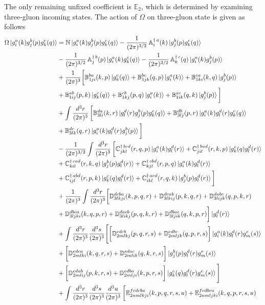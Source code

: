 \documentclass[a4paper,11pt]{article}
\def\mf#1{\mathbb{#1}}
\begin{document}
The only remaining unfixed coefficient is  $\mf{E}_{2}$, which is determined by examining three-gluon incoming states. The action of $\Omega$ on three-gluon state is given as follows
\begin{align}\label{eq:Omegaonggg}
    \Omega\ket{g^{a}_{i}(k)g^{b}_{j}(p)g^{c}_{k}(q)} & = \mf{N}\ket{g^{a}_{i}(k)g^{b}_{j}(p)g^{c}_{k}(q)}  -\frac{1}{(2\pi)^{3/2}}\, \mf{A}^{\dagger\, a}_{i}(k) \ket{g^{b}_{j}(p)g^{c}_{k}(q)} \notag \\ & - \frac{1}{(2\pi)^{3/2}}\, \mf{A}^{\dagger\, b}_{j}(p) \ket{g^{a}_{i}(k)g^{c}_{k}(q)} - \frac{1}{(2\pi)^{3/2}}\, \mf{A}^{\dagger\, c}_{k}(q) \ket{g^{a}_{i}(k)g^{b}_{j}(p)}\notag \\ & +  \frac{1}{(2\pi)^{3}}\bigg[\mf{B}^{ba}_{1ji}(k,p) \ket{g^{c}_{k}(q)} + \mf{B}^{bc}_{1jk}(q,p) \ket{g^{a}_{i}(k)}+\mf{B}^{ca}_{1ki}(k,q) \ket{g^{b}_{j}(p)}\notag \\ & +\mf{B}^{ab}_{1ij}(p,k) \ket{g^{c}_{k}(q)} + \mf{B}^{cb}_{1kj}(p,q) \ket{g^{a}_{i}(k)}+\mf{B}^{ac}_{1ik}(q,k) \ket{g^{b}_{j}(p)}  \bigg]\notag \\ & + \int \frac{d^{3}r}{(2\pi)^{3}}\, \bigg[\mf{B}^{da}_{3li}(k,r)\ket{g^{d}_{l}(r)g^{b}_{j}(p)g^{c}_{k}(q)}+\mf{B}^{db}_{3lj}(p,r)\ket{g^{a}_{i}(k)g^{d}_{l}(r)g^{c}_{k}(q)}\notag \\ & +\mf{B}^{dc}_{3lk}(q,r)\ket{g^{a}_{i}(k)g^{d}_{l}(r)g^{b}_{j}(p)}\bigg] \notag \\ & - \frac{1}{(2\pi)^{3/2}}\int \frac{d^{3}r}{(2\pi)^{3}}\,\bigg[\mf{C}^{\dagger\,bcd}_{jkl}(r,q,p)\ket{g^{a}_{i}(k)g^{d}_{l}(r)}+\mf{C}^{\dagger\,bad}_{jil}(r,k,p)\ket{g^{c}_{k}(q)g^{d}_{l}(r)}\notag \\ & +\mf{C}^{\dagger\,cad}_{kil}(r,k,q)\ket{g^{b}_{j}(p)g^{d}_{l}(r)}+\mf{C}^{\dagger\,cbd}_{kjl}(r,p,q)\ket{g^{a}_{i}(k)g^{d}_{l}(r)}\notag \\ & +\mf{C}^{\dagger\,abd}_{ijl}(r,p,k)\ket{g^{c}_{k}(q)g^{d}_{l}(r)}+\mf{C}^{\dagger\,acd}_{ikl}(r,q,k)\ket{g^{b}_{j}(p)g^{d}_{l}(r)}\bigg]\notag \\ & +  \frac{1}{(2\pi)^{3}}\int \frac{d^{3}r}{(2\pi)^{3}}\bigg[\mf{D}^{dcba}_{3lkji}(k,p,q,r)+\mf{D}^{dcab}_{3lkij}(p,k,q,r)+\mf{D}^{dabc}_{3lijk}(q,p,k,r)\notag \\ & + \mf{D}^{dbca}_{3ljki}(k,q,p,r)+\mf{D}^{dacb}_{3likj}(p,q,k,r)+\mf{D}^{dbac}_{3ljik}(q,k,p,r)\bigg]\ket{g^{d}_{l}(r)}\notag \\ & + \int \frac{d^{3}r}{(2\pi)^{3}}\frac{d^{3}s}{(2\pi)^{3}}\Bigg[\bigg[\mf{D}^{edcb}_{2mlkj}(p,q,r,s)+\mf{D}^{edbc}_{2mljk}(q,p,r,s)\bigg]\ket{g^{a}_{i}(k)g^{d}_{l}(r)g^{e}_{m}(s)}\notag \\ & + \bigg[\mf{D}^{edca}_{2mlki}(k,q,r,s)+\mf{D}^{edac}_{2mlik}(q,k,r,s)\bigg]\ket{g^{b}_{j}(p)g^{d}_{l}(r)g^{e}_{m}(s)}\notag \\ & +\bigg[\mf{D}^{edab}_{2mlij}(p,k,r,s)+\mf{D}^{edba}_{2mlji}(k,p,r,s)\bigg]\ket{g^{c}_{k}(q)g^{d}_{l}(r)g^{e}_{m}(s)}\Bigg]\notag \\ & +\int \frac{d^{3}r}{(2\pi)^{3}}\frac{d^{3}s}{(2\pi)^{3}}\frac{d^{3}u}{(2\pi)^{3}}\,\bigg[\mf{E}^{fedcba}_{2nmlkji}(k,p,q,r,s,u)+\mf{E}^{fedbca}_{2nmljki}(k,q,p,r,s,u)\notag \\ & 
\end{align}
\end{document}
